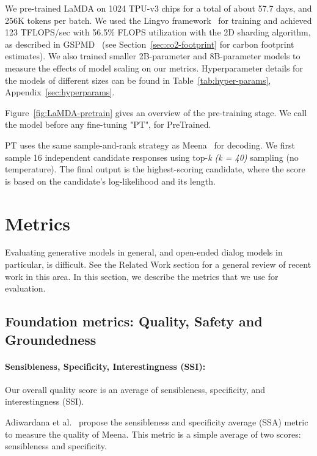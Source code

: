 We pre-trained LaMDA on 1024 TPU-v3 chips for a total of about 57.7 days, and 256K tokens per batch. We used the Lingvo framework~\cite{shen2019lingvo} for training and achieved 123 TFLOPS/sec with 56.5\% FLOPS utilization with the 2D sharding algorithm, as described in GSPMD~\cite{gspmd21} (see Section~\ref{sec:co2-footprint} for carbon footprint estimates). We also trained smaller 2B-parameter and 8B-parameter models to measure the effects of model scaling on our metrics. Hyperparameter details for the models of different sizes can be found in Table~\ref{tab:hyper-params}, Appendix~\ref{sec:hyperparams}.

Figure~\ref{fig:LaMDA-pretrain} gives an overview of the pre-training stage. We call the model before any fine-tuning "PT", for PreTrained.

PT uses the same sample-and-rank strategy as Meena~\cite{adiwardana2020humanlike} for decoding. We first sample 16 independent candidate responses using top-\textit{k (k = 40)} sampling (no temperature). The final output is the highest-scoring candidate, where the score is based on the candidate’s log-likelihood and its length. 

\section{Metrics}
\label{sec:metric}

Evaluating generative models in general, and open-ended dialog models in particular, is difficult. See the Related Work section for a general review of recent work in this area. In this section, we describe the metrics that we use for evaluation.

\subsection{Foundation metrics: Quality, Safety and Groundedness}
\label{sec:multitask}

\paragraph{Sensibleness, Specificity, Interestingness (SSI): }Our overall quality score is an average of sensibleness, specificity, and interestingness (SSI).

Adiwardana et al.~\cite{adiwardana2020humanlike} propose the sensibleness and specificity average (SSA) metric to measure the quality of Meena. This metric is a simple average of two scores: sensibleness and specificity.

